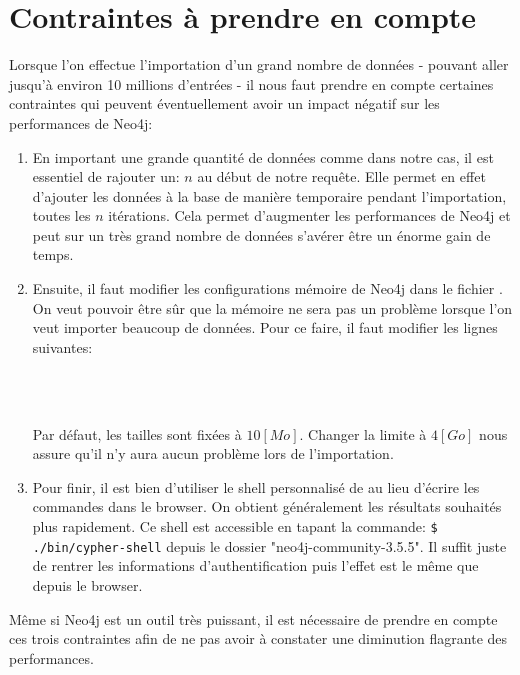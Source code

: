 \documentclass[12pt,twoside, openright]{memoir}
\newcommand{\courrier}[1]{{\fontfamily{qcr}\selectfont {#1}}}
\begin{document}
	\section{Contraintes à prendre en compte}
	Lorsque l'on effectue l'importation d'un grand nombre de données - pouvant aller jusqu'à environ 10 millions d'entrées - il nous faut prendre en compte certaines contraintes qui peuvent éventuellement avoir un impact négatif sur les performances de Neo4j:
	\begin{enumerate}
		\item En important une grande quantité de données comme dans notre cas, il est essentiel de rajouter un: \courrier{USING PERIODIC COMMIT} $n$ au début de notre requête. Elle permet en effet d'ajouter les données à la base de manière temporaire pendant l'importation, toutes les $n$ itérations. Cela permet d'augmenter les performances de Neo4j et peut sur un très grand nombre de données s'avérer être un énorme gain de temps.
		\item Ensuite, il faut modifier les configurations mémoire de Neo4j dans le fichier \courrier{neo4j.conf}. On veut pouvoir être sûr que la mémoire ne sera pas un problème lorsque l'on veut importer beaucoup de données. Pour ce faire, il faut modifier les lignes suivantes:
		\begin{center}
			\courrier{dbms.memory.heap.max_size=4g}\\
			\courrier{dbms.memory.heap.initial_size=4g}\\
			\courrier{dbms.memory.pagecache.size=4g}
		\end{center}
		Par défaut, les tailles sont fixées à $10[Mo]$. Changer la limite à $4[Go]$ nous assure qu'il n'y aura aucun problème lors de l'importation.
		\item Pour finir, il est bien d'utiliser le shell personnalisé de \courrier{Cypher} au lieu d'écrire les commandes dans le browser. On obtient généralement les résultats souhaités plus rapidement. Ce shell est accessible en tapant la commande:
		\texttt{\$ ./bin/cypher-shell} depuis le dossier "neo4j-community-3.5.5". Il suffit juste de rentrer les informations d'authentification puis l'effet est le même que depuis le browser.
	\end{enumerate}
	Même si Neo4j est un outil très puissant, il est nécessaire de prendre en compte ces trois contraintes afin de ne pas avoir à constater une diminution flagrante des performances.
	
\end{document}
